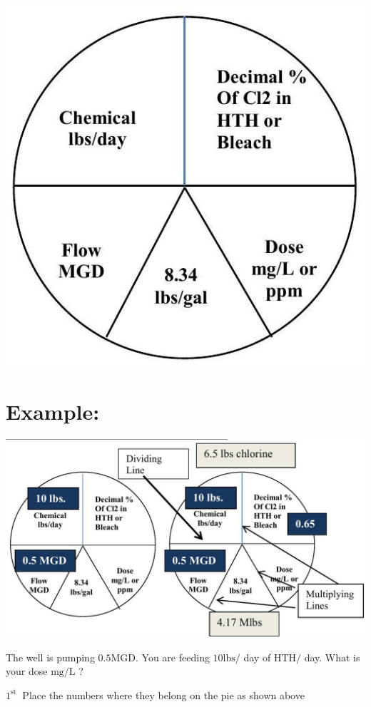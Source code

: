 \documentclass[10pt]{article}
\begin{document}
\includegraphics[max width=\textwidth]{2022_09_16_0c6b804a9b26a8df4e8fg-08}

\section{Example:}
\includegraphics[max width=\textwidth]{2022_09_16_0c6b804a9b26a8df4e8fg-08(1)}

The well is pumping $0.5 \mathrm{MGD}$. You are feeding $10 \mathrm{lbs} /$ day of $\mathrm{HTH} /$ day. What is your dose $\mathrm{mg} / \mathrm{L}$ ?

$1^{\text {st }}$ Place the numbers where they belong on the pie as shown above
\end{document}
